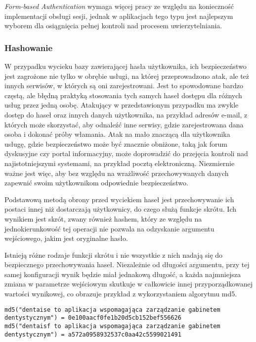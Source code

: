 \documentclass[11pt]{aghdpl}
\begin{document}
\emph{Form-based Authentication} wymaga więcej pracy ze względu na konieczność implementacji obsługi sesji, jednak w aplikacjach tego typu jest najlepszym wyborem dla osiągnięcia pełnej kontroli nad procesem uwierzytelniania.

\subsubsection{Hashowanie}
\label{sec:hashowanie}

W przypadku wycieku bazy zawierającej hasła użytkownika, ich bezpieczeństwo jest zagrożone nie tylko w obrębie usługi, na której przeprowadzono atak, ale też innych serwisów, w których są oni zarejestrowani. Jest to spowodowane bardzo częstą, ale błędną praktyką stosowania tych samych haseł dostępu dla różnych usług przez jedną osobę. Atakujący w przedstawionym przypadku ma zwykle dostęp do haseł oraz innych danych użytkownika, na przykład adresów e-mail, z których może skorzystać, aby odnaleźć inne serwisy, gdzie zarejestrowana dana osoba i dokonać próby włamania. Atak na mało znaczącą dla użytkownika usługę, gdzie bezpieczeństwo może być znacznie obniżone, taką jak forum dyskusyjne czy portal informacyjny, może doprowadzić do przejęcia kontroli nad najistotniejszymi systemami, na przykład pocztą elektroniczną. Niezmiernie ważne jest więc, aby bez względu na wrażliwość przechowywanych danych zapewnić swoim użytkownikom odpowiednie bezpieczeństwo.

Podstawową metodą obrony przed wyciekiem haseł jest przechowywanie ich postaci innej niż dostarczają użytkownicy, do czego służą funkcje skrótu. Ich wynikiem jest skrót, zwany również hashem, który ze względu na jednokierunkowość tej operacji nie pozwala na odzyskanie argumentu wejściowego, jakim jest oryginalne hasło.

Istnieją różne rodzaje funkcji skrótu i nie wszystkie z nich nadają się do bezpiecznego przechowywania haseł. Niezależnie od długości argumentu, przy tej samej konfiguracji wynik będzie miał jednakową długość, a każda najmniejsza zmiana w parametrze wejściowym skutkuje w całkowicie innej przyporządkowanej wartości wynikowej, co obrazuje przykład z wykorzystaniem algorytmu md5.

\begin{lstlisting}
md5("dentaise to aplikacja wspomagająca zarządzanie gabinetem dentystycznym") = 0e100aacf0fe1b20d5cb152bef556626
md5("dentaisf to aplikacja wspomagająca zarządzanie gabinetem dentystycznym") = a572a0958932537c0aa42c5599021491
\end{lstlisting}
\end{document}
